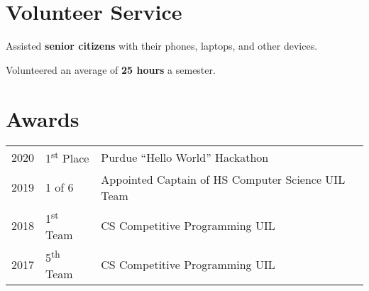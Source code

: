 \documentclass[letterpaper]{deedy-resume} %
\begin{document}
\begin{minipage}[t]{0.66\textwidth}
\section{Volunteer Service}


\begin{tightitemize}
\item Assisted \textbf{senior citizens} with their phones, laptops, and other devices.
\item Volunteered an average of \textbf{25 hours} a semester.
\end{tightitemize}

\sectionspace %


\section{Awards} 

\begin{tabular}{rll}
2020	 & 1\textsuperscript{st} Place & Purdue ``Hello World'' Hackathon\\
2019	 & 1 of 6 & Appointed Captain of HS Computer Science UIL Team\\
2018	 & 1\textsuperscript{st} Team & CS Competitive Programming UIL \\
2017	 & 5\textsuperscript{th} Team & CS Competitive Programming UIL\\
\end{tabular}

\sectionspace %

%
%
%


\end{minipage} %
\end{document}
